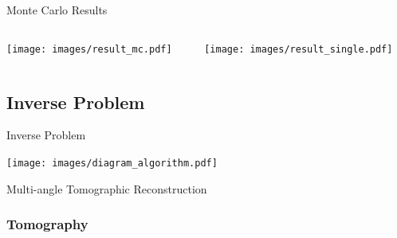 \documentclass[compress,red,12pt]{beamer}
\begin{document}

\begin{frame}{Monte Carlo Results}
  \begin{columns}[T]
    \begin{column}{.5\textwidth}
      \centering
      {
        \texttt{[image: images/result\_mc.pdf]}
      }
      {
        \centerline{\def\svgwidth{0.8\linewidth}\footnotesize{}}
      }
    \end{column}
    \begin{column}{.5\textwidth}
      \centering
      {
        \texttt{[image: images/result\_single.pdf]}
      }
      {
        \centerline{\def\svgwidth{0.8\linewidth}\footnotesize{}}
      }
    \end{column}
  \end{columns}
\end{frame}


\subsection{Inverse Problem}

\begin{frame}{Inverse Problem}
  \begin{center}
    \texttt{[image: images/diagram\_algorithm.pdf]}
  \end{center}
\end{frame}

\begin{frame}{Multi-angle Tomographic Reconstruction}
  \begin{center}
    \centerline{\def\svgwidth{\linewidth}\small{}}
  \end{center}
\end{frame}


\subsubsection{Tomography}
\end{document}
